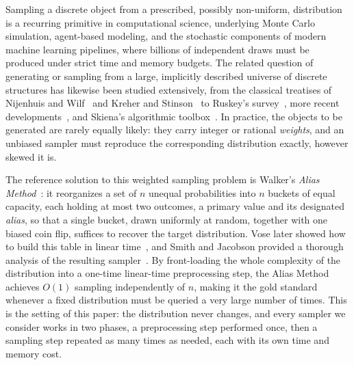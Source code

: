 Sampling a discrete object from a prescribed, possibly non-uniform, distribution is a recurring primitive
in computational science, underlying Monte Carlo simulation, agent-based modeling, and the stochastic
components of modern machine learning pipelines, where billions of independent draws must be produced
under strict time and memory budgets. The related question of generating or sampling from a large,
implicitly described universe of discrete structures has likewise been studied extensively, from the
classical treatises of Nijenhuis and Wilf~\cite{NW75} and Kreher and Stinson~\cite{KS99} to Ruskey's
survey~\cite{Ruskey03}, more recent developments~\cite{GP21}, and Skiena's algorithmic
toolbox~\cite{Skiena20}. In practice, the objects to be generated are rarely equally likely: they carry
integer or rational \emph{weights}, and an unbiased sampler must reproduce the corresponding distribution
exactly, however skewed it is.

The reference solution to this weighted sampling problem is Walker's \emph{Alias
Method}~\cite{Walker74,Walker77}: it reorganizes a set of $n$ unequal probabilities into $n$ buckets of
equal capacity, each holding at most two outcomes, a primary value and its designated \emph{alias}, so that
a single bucket, drawn uniformly at random, together with one biased coin flip, suffices to recover the
target distribution. Vose later showed how to build this table in linear time~\cite{Vose91}, and Smith and
Jacobson provided a thorough analysis of the resulting sampler~\cite{SJ05}. By front-loading the whole
complexity of the distribution into a one-time linear-time preprocessing step, the Alias Method achieves
$O(1)$ sampling independently of $n$, making it the gold standard whenever a fixed distribution must be
queried a very large number of times. This is the setting of this paper: the distribution never changes, and
every sampler we consider works in two phases, a preprocessing step performed once, then a sampling step
repeated as many times as needed, each with its own time and memory cost.

